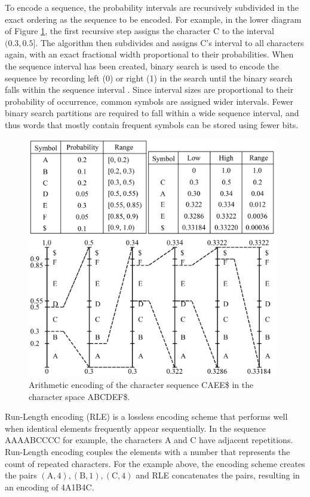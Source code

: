 

To encode a sequence, the probability intervals are recursively subdivided in the exact ordering as the sequence to be encoded. For example, in the lower diagram of Figure \ref{img:arith_enco}, the first recursive step assigns the character C to the interval $(0.3, 0.5]$. The algorithm then subdivides and assigns C's interval to all characters again, with an exact fractional width proportional to their probabilities. When the sequence interval has been created, binary search is used to encode the sequence by recording left (0) or right (1) in the search until the binary search falls within the sequence interval \cite{arithmetic_encoding}. Since interval sizes are proportional to their probability of occurrence, common symbols are assigned wider intervals. Fewer binary search partitions are required to fall within a wide sequence interval, and thus words that mostly contain frequent symbols can be stored using fewer bits.

\begin{figure}[htbp]
    \centering
    \includegraphics[width=11cm]{images/arithmectic.png}
    \caption{Arithmetic encoding of the character sequence CAEE\$ in the character space ABCDEF\$.}
    \label{img:arith_enco}
\end{figure}


Run-Length encoding (RLE) is a lossless encoding scheme that performs well when identical elements frequently appear sequentially. In the sequence AAAABCCCC for example, the characters A and C have adjacent repetitions. Run-Length encoding couples the elements with a number that represents the count of repeated characters. For the example above, the encoding scheme creates the pairs $(\text{A}, 4), (\text{B}, 1), (\text{C}, 4)$ and RLE concatenates the pairs, resulting in an encoding of 4A1B4C.

